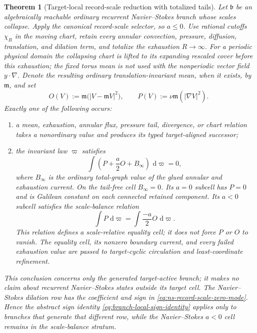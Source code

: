 \documentclass[11pt]{article}
\numberwithin{section}{part}
\theoremstyle{plain}
\newtheorem{theorem}{Theorem}[section]
\theoremstyle{definition}
\theoremstyle{remark}
\newcommand{\dd}{\,\mathrm d}
\begin{document}
\begin{theorem}[Target-local record-scale reduction with totalized tails]
\label{thm:ns-target-local-record-scale-reduction}
Let \(\mathfrak b\) be an algebraically reachable ordinary recurrent
Navier--Stokes branch whose scales collapse.  Apply the canonical record-scale
selector, so \(a\le0\).  Use rational cutoffs \(\chi_R\) in the moving chart,
retain every annular convection, pressure, diffusion, translation, and
dilation term, and totalize the exhaustion \(R\to\infty\).  For a periodic
physical domain the collapsing chart is lifted to its expanding rescaled
cover before this exhaustion; the fixed torus mean is not used with the
nonperiodic vector field \(y\cdot\nabla\).  Denote the resulting ordinary
translation-invariant mean, when it exists, by \(\mathfrak m\), and set
\[
 O(V):=\mathfrak m\bigl(|V-\mathfrak mV|^2\bigr),
 \qquad
 P(V):=\nu\mathfrak m(|\nabla V|^2).
\]
Exactly one of the following occurs:
\begin{enumerate}[label=\textup{(M\arabic*)}]
\item a mean, exhaustion, annular flux, pressure tail, divergence, or chart
relation takes a nonordinary value and produces its typed target-aligned
successor;
\item the invariant law \(\varpi\) satisfies
\begin{equation}
 \label{eq:ns-record-scale-zero-mode}
 \int\left(P+\frac a2O+B_\infty\right)\,\dd\varpi=0,
\end{equation}
where \(B_\infty\) is the ordinary total-graph value of the glued annular and
exhaustion current.  On the tail-free cell \(B_\infty=0\).  Its \(a=0\)
subcell has \(P=0\) and is Galilean constant on each connected retained
component.  Its \(a<0\) subcell satisfies the scale-balance relation
\begin{equation}
 \label{eq:ns-record-scale-balance}
 \int P\,\dd\varpi
 =\int\frac{-a}{2}O\,\dd\varpi.
\end{equation}
This relation defines a scale-relative equality cell; it does not force
\(P\) or \(O\) to vanish.  The equality cell, its nonzero boundary current,
and every failed exhaustion value are passed to target-cyclic circulation
and least-coordinate refinement.
\end{enumerate}
This conclusion concerns only the generated target-active branch; it makes no claim
about recurrent Navier--Stokes states outside its target cell.
The Navier--Stokes dilation row has the coefficient and sign in
\eqref{eq:ns-record-scale-zero-mode}.  Hence the abstract sign identity
\eqref{eq:branch-local-sign-identity} applies only to branches that generate
that different row, while the Navier--Stokes \(a<0\) cell remains in the
scale-balance stratum.
\end{theorem}
\end{document}
